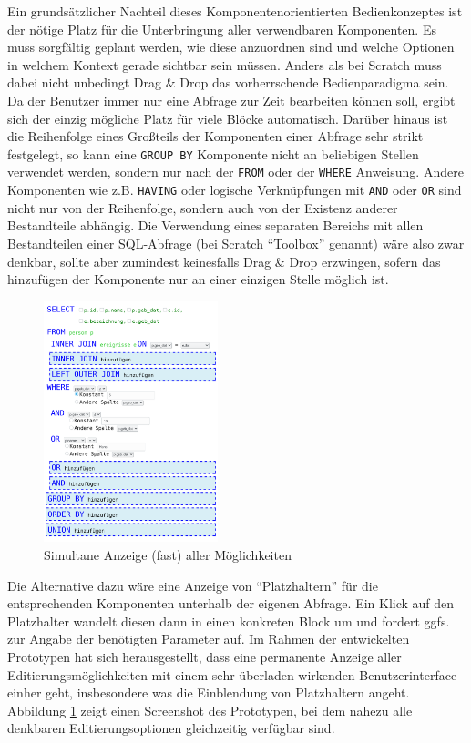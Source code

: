 \documentclass[paper=a4,fontsize=11pt,parskip=half]{scrartcl}
\begin{document}
Ein grundsätzlicher Nachteil dieses Komponentenorientierten Bedienkonzeptes ist der nötige Platz für die Unterbringung aller verwendbaren Komponenten. Es muss sorgfältig geplant werden, wie diese anzuordnen sind und welche Optionen in welchem Kontext gerade sichtbar sein müssen. Anders als bei Scratch muss dabei nicht unbedingt Drag \& Drop das vorherrschende Bedienparadigma sein. Da der Benutzer immer nur eine Abfrage zur Zeit bearbeiten können soll, ergibt sich der einzig mögliche Platz für viele Blöcke automatisch. Darüber hinaus ist die Reihenfolge eines Großteils der Komponenten einer Abfrage sehr strikt festgelegt, so kann eine \texttt{GROUP BY} Komponente nicht an beliebigen Stellen verwendet werden, sondern nur nach der \texttt{FROM} oder der \texttt{WHERE} Anweisung. Andere Komponenten wie z.B. \texttt{HAVING} oder logische Verknüpfungen mit \texttt{AND} oder \texttt{OR} sind nicht nur von der Reihenfolge, sondern auch von der Existenz anderer Bestandteile abhängig. Die Verwendung eines separaten Bereichs mit allen Bestandteilen einer SQL-Abfrage (bei Scratch ``Toolbox'' genannt) wäre also zwar denkbar, sollte aber zumindest keinesfalls Drag \& Drop erzwingen, sofern das hinzufügen der Komponente nur an einer einzigen Stelle möglich ist.

\begin{figure}
  \includegraphics[width=0.45\textwidth]{images/sql-sketch-all-editing}
  \caption{Simultane Anzeige (fast) aller Möglichkeiten}
  \label{fig:screen-sql-editor-all-editing}
\end{figure}

Die Alternative dazu wäre eine Anzeige von ``Platzhaltern'' für die entsprechenden Komponenten unterhalb der eigenen Abfrage. Ein Klick auf den Platzhalter wandelt diesen dann in einen konkreten Block um und fordert ggfs. zur Angabe der benötigten Parameter auf. Im Rahmen der entwickelten Prototypen hat sich herausgestellt, dass eine permanente Anzeige aller Editierungsmöglichkeiten mit einem sehr überladen wirkenden Benutzerinterface einher geht, insbesondere was die Einblendung von Platzhaltern angeht. Abbildung \ref{fig:screen-sql-editor-all-editing} zeigt einen Screenshot des Prototypen, bei dem nahezu alle denkbaren Editierungsoptionen gleichzeitig verfügbar sind.
\end{document}
